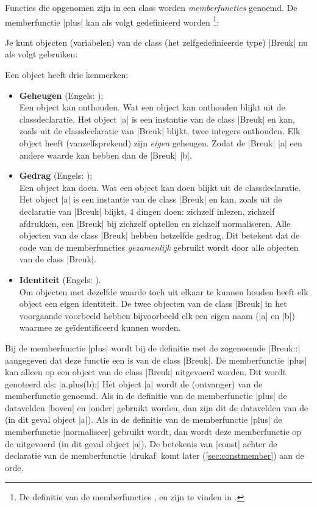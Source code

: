 \begin{cpplstShortInline}
Functies die opgenomen zijn in een class worden \emph{memberfuncties} genoemd.
De \label{Breuk::plus}memberfunctie |plus| kan als volgt gedefinieerd worden%
\footnote{%
    De definitie van de memberfuncties ,  en  zijn te vinden in .
}:

Je kunt objecten (variabelen) van de class (het zelfgedefinieerde type) |Breuk| nu als volgt gebruiken:

Een object heeft drie kenmerken:
\begin{itemize}
    \item \textbf{Geheugen} (Engels: \emph{});\\
Een object kan  onthouden.
Wat een object kan onthouden blijkt uit de classdeclaratie.
Het object |a| is een instantie van de class |Breuk| en kan, zoals uit de classdeclaratie van |Breuk| blijkt, twee integers onthouden.
Elk object heeft (vanzelfsprekend) zijn \emph{eigen} geheugen.
Zodat de |Breuk| |a| een andere waarde kan hebben dan de |Breuk| |b|.    
    \item \textbf{Gedrag} (Engels: \emph{});\\
Een object kan  doen.
Wat een object kan doen blijkt uit de classdeclaratie.
Het object |a| is een instantie van de class |Breuk| en kan, zoals uit de declaratie van |Breuk| blijkt, 4 dingen doen: zichzelf inlezen, zichzelf afdrukken, een |Breuk| bij zichzelf optellen en zichzelf normaliseren.
Alle objecten van de class |Breuk| hebben hetzelfde gedrag.
Dit betekent dat de code van de memberfuncties \emph{gezamenlijk} gebruikt wordt door alle objecten van de class |Breuk|.
    \item \textbf{Identiteit} (Engels: \emph{}).\\
Om objecten met dezelfde waarde toch uit elkaar te kunnen houden heeft elk object een eigen identiteit.
De twee objecten van de class |Breuk| in het voorgaande voorbeeld hebben bijvoorbeeld elk een eigen naam (|a| en |b|) waarmee ze geïdentificeerd kunnen worden.
\end{itemize}

Bij de memberfunctie |plus| wordt bij de definitie met de zogenoemde  |Breuk::| aangegeven dat deze functie een  is van de class |Breuk|.
De memberfunctie |plus| kan alleen op een object van de class |Breuk| uitgevoerd worden.
Dit wordt genoteerd als: |a.plus(b);| Het object |a| wordt de \emph{} (ontvanger) van de memberfunctie genoemd.
Als in de definitie van de memberfunctie |plus| de datavelden |boven| en |onder| gebruikt worden, dan zijn dit de datavelden van de  (in dit geval object |a|).
Als in de definitie van de memberfunctie |plus| de memberfunctie |normaliseer| gebruikt wordt, dan wordt deze memberfunctie op de  uitgevoerd (in dit geval object |a|).
De betekenis van |const| achter de declaratie van de memberfunctie |drukaf| komt later (\cref{sec:constmember}) aan de orde.


\end{cpplstShortInline}
